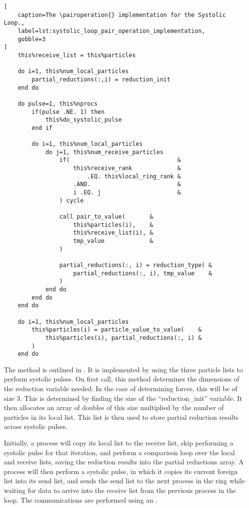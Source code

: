 \begin{lstlisting}[
    caption=The \pairoperation{} implementation for the Systolic Loop.,
    label=lst:systolic_loop_pair_operation_implementation,
    gobble=3
]
    this%receive_list = this%particles

    do i=1, this%num_local_particles
        partial_reductions(:,i) = reduction_init
    end do

    do pulse=1, this%nprocs
        if(pulse .NE. 1) then
            this%do_systolic_pulse
        end if

        do i=1, this%num_local_particles
            do j=1, this%num_receive_particles
                if(                               &
                    this%receive_rank             &
                        .EQ. this%local_ring_rank &
                    .AND.                         &
                    i .EQ. j                      &
                ) cycle

                call pair_to_value(       &
                    this%particles(i),    &
                    this%receive_list(i), &
                    tmp_value             &
                )

                partial_reductions(:, i) = reduction_type( &
                    partial_reductions(:, i), tmp_value    &
                )
            end do
        end do
    end do

    do i=1, this%num_local_particles
        this%particles(i) = particle_value_to_value(    &
            this%particles(i), partial_reductions(:, i) &
        )
    end do
\end{lstlisting}

The \pairoperation{} method is outlined in
.
It is implemented by using the three
particle lists to perform systolic pulses.
%
On first call, this method determines the dimensions of the
reduction variable needed.
%
In the case of determining forces, this will be of size 3.
%
This is determined by finding the size of the ``reduction\_init''
variable.
%
It then allocates an array of doubles of this size multiplied by the
number of particles in its local list.
%
This list is then used to store partial reduction results across
systolic pulses.

Initially, a process will copy its local list to the receive list,
skip performing a systolic pulse for that iteration, and perform
a comparison loop over the local and receive lists, saving the
reduction results into the partial reductions array.
%
A process will then perform a systolic pulse, in which it copies its
current foreign list into its send list, and sends the send list to
the next process in the ring while waiting for data to arrive 
into the receive list from the previous process in the loop.
%
The communications are performed using an \mpisendrecv{}.

